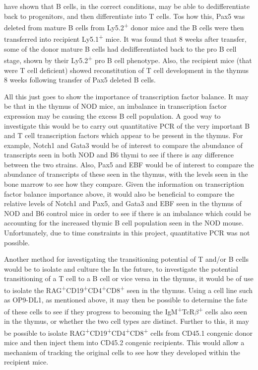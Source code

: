 \citet{Cobaleda2007} have shown that B cells, in the correct conditions, may be able to dedifferentiate back to progenitors, and then differentiate into T cells.
Tos how this, Pax5 was deleted from mature B cells from Ly5.2\textsuperscript{+} donor mice and the B cells were then transferred into recipient Ly5.1\textsuperscript{+} mice.
It was found that 8 weeks after transfer, some of the donor mature B cells had dedifferentiated back to the pro B cell stage, shown by their Ly5.2\textsuperscript{+} pro B cell phenotype.
Also, the recipient mice (that were T cell deficient) showed reconstitution of T cell development in the thymus 8 weeks following transfer of Pax5 deleted B cells.

All this just goes to show the importance of transcription factor balance.
It may be that in the thymus of NOD mice, an imbalance in transcription factor expression may be causing the excess B cell population.
A good way to investigate this would be to carry out quantitative PCR of the very important B and T cell transcription factors which appear to be present in the thymus.
For example, Notch1 and Gata3 would be of interest to compare the abundance of transcripts seen in both NOD and B6 thymi to see if there is any difference between the two strains.
Also, Pax5 and EBF would be of interest to compare the abundance of transcripts of these seen in the thymus, with the levels seen in the bone marrow to see how they compare.
Given the information on transcription factor balance importance above, it would also be beneficial to compare the relative levels of Notch1 and Pax5, and Gata3 and EBF seen in the thymus of NOD and B6 control mice in order to see if there is an imbalance which could be accounting for the increased thymic B cell population seen in the NOD mouse.
Unfortunately, due to time constraints in this project, quantitative PCR was not possible.


Another method for investigating the transitioning potential of T and/or B cells would be to isolate and culture the 
In the future, to investigate the potential transitioning of a T cell to a B cell or vice versa in the thymus, it would be of use to isolate the RAG\textsuperscript{+}CD19\textsuperscript{+}CD4\textsuperscript{+}CD8\textsuperscript{+} seen in the thymus.
Using a cell line such as OP9-DL1, as mentioned above, it may then be possible to determine the fate of these cells to see if they progress to becoming the IgM\textsuperscript{+}TcR$\beta$\textsuperscript{+} cells also seen in the thymus, or whether the two cell types are distinct.
Further to this, it may be possible to isolate RAG\textsuperscript{+}CD19\textsuperscript{+}CD4\textsuperscript{+}CD8\textsuperscript{+} cells from CD45.1 congenic donor mice and then inject them into CD45.2 congenic recipients.
This would allow a mechanism of tracking the original cells to see how they developed within the recipient mice.

